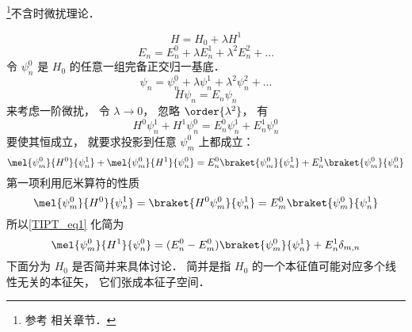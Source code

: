 
\begin{issues}
\issueDraft
\end{issues}

\footnote{参考 \cite{GriffQ} \cite{Shankar} \cite{Sakurai} \cite{Merzbacher} 相关章节．}不含时微扰理论．

\begin{equation}\label{TIPT_eq3}
H = H_0 + \lambda H^1
\end{equation}
\begin{equation}
E_n = E_n^0 + \lambda E_n^1 + \lambda^2 E_n^2 + \dots
\end{equation}
令 $\psi_n^0$ 是 $H_0$ 的任意一组完备正交归一基底．
\begin{equation}
\psi_n = \psi_n^0 + \lambda\psi_n^1 + \lambda^2 \psi_n^2 + \dots
\end{equation}
\begin{equation}
H \psi_n = E_n \psi_n
\end{equation}
来考虑一阶微扰， 令 $\lambda \to 0$， 忽略 $\order{\lambda^2}$， 有
\begin{equation}
H^0\psi_n^1 + H^1 \psi_n^0 = E_n^0 \psi_n^1 + E_n^1 \psi_n^0
\end{equation}
要使其恒成立， 就要求投影到任意 $\psi_m^0$ 上都成立：
\begin{equation}\label{TIPT_eq1}
\mel{\psi_m^0}{H^0}{\psi_n^1} + \mel{\psi_m^0}{H^1}{\psi_n^0} = E_n^0 \braket{\psi_m^0}{\psi_n^1} + E_n^1 \braket{\psi_m^0}{\psi_n^0}
\end{equation}
第一项利用厄米算符的性质
\begin{equation}
\mel{\psi_m^0}{H^0}{\psi_n^1} = \braket{H^0\psi_m^0}{\psi_n^1} = E_m^0\braket{\psi_m^0}{\psi_n^1}
\end{equation}
所以\autoref{TIPT_eq1} 化简为
\begin{equation}\label{TIPT_eq2}
\mel{\psi_m^0}{H^1}{\psi_n^0} = (E_n^0 - E_m^0) \braket{\psi_m^0}{\psi_n^1} + E_n^1 \delta_{m,n}
\end{equation}
下面分为 $H_0$ 是否简并来具体讨论． 简并是指 $H_0$ 的一个本征值可能对应多个线性无关的本征矢， 它们张成本征子空间．

